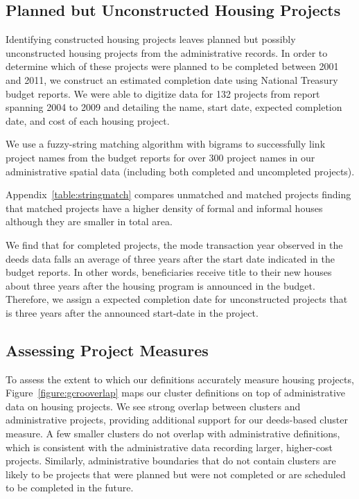 \documentclass[12pt]{article}
\begin{document}
\subsection{Planned but Unconstructed Housing Projects}


Identifying  constructed housing projects leaves  planned but possibly unconstructed housing projects from the administrative records.  In order to determine which of these projects were planned to be completed between 2001 and 2011, we construct an estimated completion date using National Treasury budget reports.  We were able to digitize data for 132 projects from report spanning 2004 to 2009 and detailing the name, start date, expected completion date, and cost of each housing project.  

We use a fuzzy-string matching algorithm with bigrams to successfully link project names from the budget reports for over 300 project names in our administrative spatial data (including both completed and uncompleted projects).  

Appendix~\ref{table:stringmatch} compares unmatched and matched projects finding that matched projects have a higher density of formal and informal houses although they are smaller in total area.  

We find that for completed projects, the mode transaction year observed in the deeds data falls an average of three years after the start date indicated in the budget reports.  In other words, beneficiaries receive title to their new houses about three years after the housing program is announced in the budget.  Therefore, we assign a expected completion date for unconstructed projects that is three years after the announced start-date in the project.  




\subsection{Assessing Project Measures}

To assess the extent to which our definitions accurately measure housing projects, Figure~\ref{figure:gcrooverlap} maps our cluster definitions on top of administrative data on housing projects.  We see strong overlap between clusters and administrative projects, providing additional support for our deeds-based cluster measure.  A few smaller clusters do not overlap with administrative definitions, which is consistent with the administrative data recording larger, higher-cost projects.  Similarly, administrative boundaries that do not contain clusters are likely to be projects that were planned but were not completed or are scheduled to be completed in the future.
\end{document}

